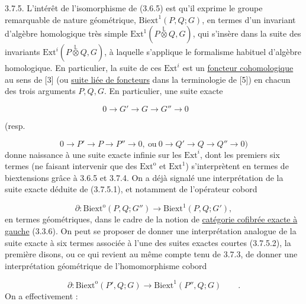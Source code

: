 3.7.5. L'intérêt de l'isomorphisme de (3.6.5) est qu'il exprime le groupe remarquable de nature géométrique, $\mathrm{Biext}^{1}(P,Q;G)$, en termes d'un invariant d'algèbre homologique très simple $\mathrm{Ext}^{1}(P \overset{\mathbb{L}}{\otimes} Q,G)$, qui s'insère dans la suite des invariants $\mathrm{Ext}^{i}(P \overset{\mathbb{L}}{\otimes} Q,G)$, à laquelle s'applique le formalisme habituel d'algèbre homologique. En particulier, la suite de ces $\mathrm{Ext}^{i}$ est un \underline{foncteur cohomologique} au sens de [3] (ou \underline{suite liée de foncteurs} dans la terminologie de [5]) en chacun des trois arguments $P,Q,G$. En particulier, une suite exacte

\begin{equation}\tag{3.7.5.1}
0 \longrightarrow G' \longrightarrow G \longrightarrow G'' \longrightarrow 0 \qquad 
\end{equation}

 (resp.

\begin{equation}\tag{3.7.5.2}
0 \longrightarrow P' \longrightarrow P \longrightarrow P'' \longrightarrow 0,\ \text{ou}\ 0 \longrightarrow Q' \longrightarrow Q \longrightarrow Q'' \longrightarrow 0)
\end{equation}
donne naissance à une suite exacte infinie sur les $\mathrm{Ext}^{i}$, dont les premiers six termes (ne faisant intervenir que des $\mathrm{Ext}^{\mathrm{o}}$ et $\mathrm{Ext}^{1}$) s'interprètent en termes de biextensions grâce à 3.6.5 et 3.7.4. On a déjà signalé une interprétation de la suite exacte déduite de (3.7.5.1), et notamment de l'opérateur cobord

\begin{equation}\tag{3.7.5.3}
\partial : \mathrm{Biext}^{\mathrm{o}}(P,Q;G'') \longrightarrow \mathrm{Biext}^{1}(P,Q;G'),
\end{equation}
en termes géométriques, dans le cadre de la notion de \underline{catégorie cofibrée exacte à gauche} (3.3.6). On peut se proposer de donner une interprétation analogue de la suite exacte à six termes associée à l'une des suites exactes courtes (3.7.5.2), la première disons, ou ce qui revient au même compte tenu de 3.7.3, de donner une interprétation géométrique de l'homomorphisme cobord

\begin{equation}\tag{3.7.5.4}
\partial : \mathrm{Biext}^{\mathrm{o}}(P',Q;G) \longrightarrow \mathrm{Biext}^{1}(P'',Q;G) \qquad .
\end{equation}
On a effectivement :

